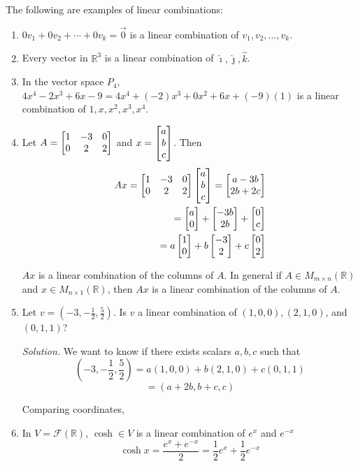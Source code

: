 \begin{example} The following are examples of linear combinations:

\begin{enumerate}
\item $0v_1 + 0v_2 + \cdots + 0v_k = \vec{0}$ is a linear combination of $v_1, v_2, \dots, v_k$.

\item Every vector in $\mathbb{R}^3$ is a linear combination of $\hat{\imath}, \hat{\jmath}, \hat{k}$.

\item In the vector space $P_4$, $4x^4 - 2x^3 + 6x - 9 = 4x^4 + (-2)x^3 + 0x^2 + 6x + (-9)(1)$ is a linear combination of $1, x, x^2, x^3, x^4$.

\item Let $A = \begin{bmatrix} 1 & -3 & 0 \\ 0 & 2 & 2 \end{bmatrix}$ and $x = \begin{bmatrix} a \\ b \\ c \end{bmatrix}$. Then
\begin{align*}
Ax = \begin{bmatrix} 1 & -3 & 0 \\ 0 & 2 & 2 \end{bmatrix}\begin{bmatrix} a \\ b \\ c \end{bmatrix} = \begin{bmatrix} a - 3b \\ 2b + 2c \end{bmatrix} \\
=\begin{bmatrix} a \\ 0 \end{bmatrix} + \begin{bmatrix} -3b \\ 2b \end{bmatrix} + \begin{bmatrix} 0 \\ c \end{bmatrix} \\
= a\begin{bmatrix} 1 \\ 0 \end{bmatrix} + b\begin{bmatrix} -3 \\ 2 \end{bmatrix} + c\begin{bmatrix} 0 \\ 2 \end{bmatrix}
\end{align*}

$Ax$ is a linear combination of the columns of $A$. In general if $A \in M_{m \times n}(\mathbb{R})$ and $x \in M_{n \times 1}(\mathbb{R})$, then $Ax$ is a linear combination of the columns of $A$.

\item Let $v = (-3, -\frac{1}{2}, \frac{5}{2})$. Is $v$ a linear combination of $(1, 0, 0), (2, 1, 0)$, and $(0, 1, 1)$?

\textit{Solution.} We want to know if there exists scalars $a, b, c$ such that
$$\left(-3, -\frac{1}{2}, \frac{5}{2}\right) = a\left(1, 0, 0\right) + b(2, 1, 0) + c(0, 1, 1)$$
$$=(a + 2b, b + c, c)$$

Comparing coordinates,

\item In $V = \mathscr{F}(\mathbb{R})$, $\cosh \in V$ is a linear combination of $e^x$ and $e^{-x}$
$$\cosh x = \frac{e^x + e^{-x}}{2} = \frac{1}{2}e^x + \frac{1}{2}e^{-x}$$
\end{enumerate}


\end{example}

